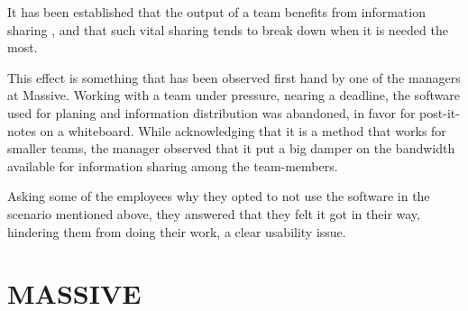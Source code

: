 It has been established that the output of a team benefits from information
sharing\cite{%
citeInformationSharingTeamPerformanceMeta,%
citeContextualizedRelationshipBetweenKnowledgeSharingandPerformanceinSoftwareDevelopment%
}
, and that such vital sharing tends to break down when it is needed
the most\cite{citeInformationSharingTeamPerformanceMeta}.

This effect is something that has been observed first hand by one of the
managers at Massive. Working with a team under pressure, nearing a deadline,
the software used for planing and information distribution was abandoned, in
favor for post-it-notes on a whiteboard. While acknowledging that it is a
method that works for smaller teams, the manager observed that it put a big
damper on the bandwidth available for information sharing among the
team-members.

Asking some of the employees why they opted to not use the software in the scenario
mentioned above, they answered that they felt it got in their way, hindering
them from doing their work, a clear usability issue.

%
%
%


%
%



\section[MASSIVE Entertainment | A Ubisoft studio]{MASSIVE}

{}

